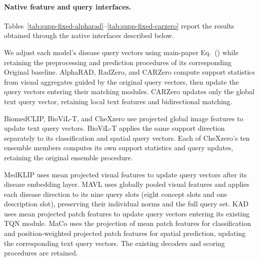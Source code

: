 \paragraph{Native feature and query interfaces.}
\label{supp:native_interfaces}
Tables~\ref{tab:supp-fixed-alpharad}--\ref{tab:supp-fixed-carzero} report the results obtained through the native interfaces described below.

We adjust each model's disease query vectors using main-paper Eq.~() while retaining the preprocessing and prediction procedures of its corresponding Original baseline. AlphaRAD, RadZero, and CARZero compute support statistics from visual aggregates guided by the original query vectors, then update the query vectors entering their matching modules. CARZero updates only the global text query vector, retaining local text features and bidirectional matching.

BiomedCLIP, BioViL-T, and CheXzero use projected global image features to update text query vectors. BioViL-T applies the same support direction separately to its classification and spatial query vectors. Each of CheXzero's ten ensemble members computes its own support statistics and query updates, retaining the original ensemble procedure.

MedKLIP uses mean projected visual features to update query vectors after its disease embedding layer. MAVL uses globally pooled visual features and applies each disease direction to its nine query slots (eight concept slots and one description slot), preserving their individual norms and the full query set. KAD uses mean projected patch features to update query vectors entering its existing TQN module. MaCo uses the projection of mean patch features for classification and position-weighted projected patch features for spatial prediction, updating the corresponding text query vectors. The existing decoders and scoring procedures are retained.
